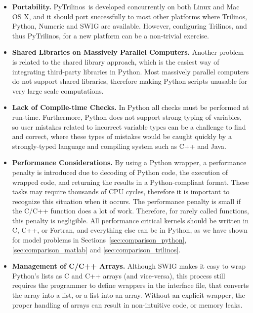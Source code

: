 \documentclass[acmtocl]{acmtrans2m}
\newcommand{\PyTrilinos}{{PyTrilinos}}
\begin{document}
\begin{itemize}

\item {\bf Portability.} \PyTrilinos\ is developed concurrently on
  both Linux and Mac OS X, and it should port successfully to most
  other platforms where Trilinos, Python, Numeric and SWIG are
  available.  However, configuring Trilinos, and thus \PyTrilinos, for
  a new platform can be a non-trivial exercise.

\item {\bf Shared Libraries on Massively Parallel Computers.} Another
  problem is related to the shared library approach, which is the
  easiest way of integrating third-party libraries in Python.  Most
  massively parallel computers do not support shared libraries,
  therefore making Python scripts unusable for very large scale
  computations.

\item {\bf Lack of Compile-time Checks.} In Python all checks must be
  performed at run-time.  Furthermore, Python does not support strong
  typing of variables, so user mistakes related to incorrect variable
  types can be a challenge to find and correct, where these types of
  mistakes would be caught quickly by a strongly-typed language and
  compiling system such as C++ and Java.

\item {\bf Performance Considerations.}  By using a Python wrapper, a
  performance penalty is introduced due to decoding of Python code,
  the execution of wrapped code, and returning the results in a
  Python-compliant format.  These tasks may require thousands of CPU
  cycles, therefore it is important to recognize this situation when
  it occurs.  The performance penalty is small if the C/C++ function
  does a lot of work.  Therefore, for rarely called functions, this
  penalty is negligible.  All performance critical kernels should be
  written in C, C++, or Fortran, and everything else can be in Python,
  as we have shown for model problems in
  Sections~\ref{sec:comparison_python}, \ref{sec:comparison_matlab}
  and \ref{sec:comparison_trilinos}.

\item {\bf Management of C/C++ Arrays.} Although SWIG makes it easy to
  wrap Python's lists as C and C++ arrays (and vice-versa), this
  process still requires the programmer to define wrappers in the
  interface file, that converts the array into a list, or a list into
  an array.  Without an explicit wrapper, the proper handling of
  arrays can result in non-intuitive code, or memory leaks.


\end{itemize}
\end{document}
